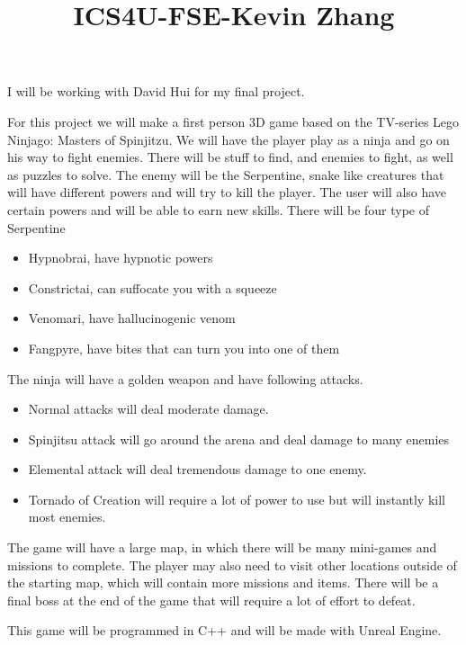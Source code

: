 \documentclass{article}
\begin{document}
\title{ICS4U-FSE-Kevin Zhang}
\maketitle

I will be working with David Hui for my final project.

For this project we will make a first person 3D game based on the TV-series Lego Ninjago: Masters of Spinjitzu.
We will have the player play as a ninja and go on his way to fight enemies. There will be stuff to find, and enemies to fight, as well as puzzles to solve.
The enemy will be the Serpentine, snake like creatures that will have different powers and will try to kill the player.
The user will also have certain powers and will be able to earn new skills.
There will be four type of Serpentine
\begin{itemize}
	\item Hypnobrai, have hypnotic powers
	\item Constrictai, can suffocate you with a squeeze
	\item Venomari, have hallucinogenic venom
	\item Fangpyre, have bites that can turn you into one of them
\end{itemize}
The ninja will have a golden weapon and have following attacks.
\begin{itemize}
	\item Normal attacks will deal moderate damage.
	\item Spinjitsu attack will go around the arena and deal damage to many enemies
	\item Elemental attack will deal tremendous damage to one enemy.
	\item Tornado of Creation will require a lot of power to use but will instantly kill most enemies.
\end{itemize}
The game will have a large map, in which there will be many mini-games and missions to complete.
The player may also need to visit other locations outside of the starting map, which will contain more missions and items.
There will be a final boss at the end of the game that will require a lot of effort to defeat.

This game will be programmed in C++ and will be made with Unreal Engine.
\end{document}
